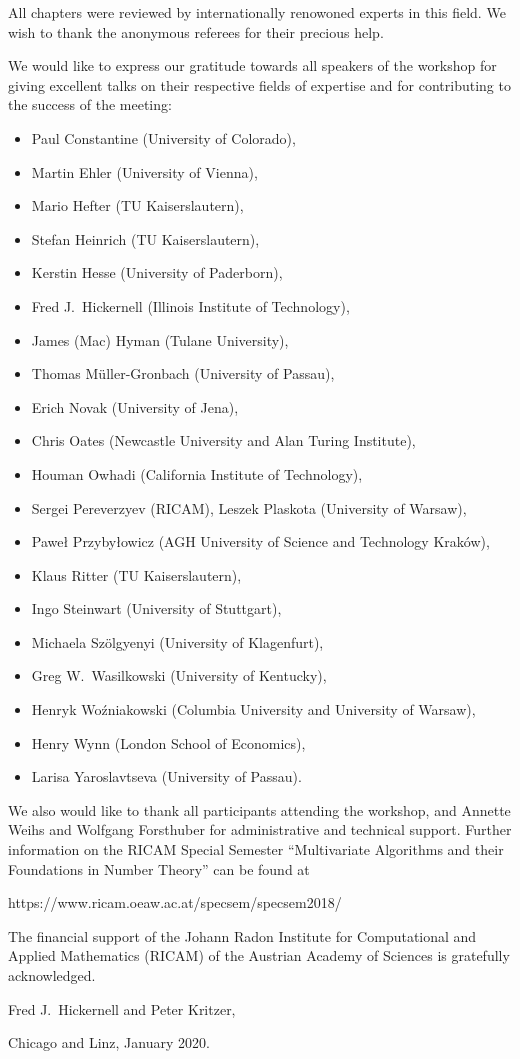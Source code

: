 \documentclass[11pt,a4paper]{article}
\begin{document}
All chapters were reviewed by internationally renowoned experts in this field. We wish to thank the anonymous referees 
for their precious help.

We would like to express our gratitude towards all speakers of the 
workshop for giving excellent talks on their respective fields of expertise and for contributing to the success of 
the meeting: 
\begin{itemize}
\item Paul Constantine (University of Colorado), 
\item Martin Ehler (University of Vienna), 
\item Mario Hefter (TU Kaiserslautern), 
\item Stefan Heinrich (TU Kaiserslautern), 
\item Kerstin Hesse (University of Paderborn),
\item Fred J.~Hickernell (Illinois Institute of Technology), 
\item James (Mac) Hyman (Tulane University),
\item Thomas M\"{u}ller-Gronbach (University of Passau), 
\item Erich Novak (University of Jena), 
\item Chris Oates (Newcastle University and Alan Turing Institute), 
\item Houman Owhadi (California Institute of Technology),
\item Sergei Pereverzyev (RICAM), Leszek Plaskota (University of Warsaw), 
\item Pawe\l{} Przyby\l{}owicz (AGH University of Science and Technology Krak\'{o}w),
\item Klaus Ritter (TU Kaiserslautern), 
\item Ingo Steinwart (University of Stuttgart),
\item Michaela Sz\"{o}lgyenyi (University of Klagenfurt), 
\item Greg W.~Wasilkowski (University of Kentucky), 
\item Henryk Wo\'{z}niakowski (Columbia University and University of Warsaw),
\item Henry Wynn (London School of Economics), 
\item Larisa Yaroslavtseva (University of Passau).
\end{itemize}


We also would like to thank all participants attending the workshop, 
and Annette Weihs and Wolfgang Forsthuber for administrative and technical support. Further information 
on the RICAM Special Semester ``Multivariate Algorithms and their Foundations in Number Theory'' can 
be found at
\begin{center}
 https://www.ricam.oeaw.ac.at/specsem/specsem2018/ 
\end{center}




The financial support of the Johann Radon Institute for Computational and Applied Mathematics (RICAM) 
of the Austrian Academy of Sciences is gratefully acknowledged.


\bigskip

Fred J.~Hickernell and Peter Kritzer,

Chicago and Linz, January 2020.
\end{document}
